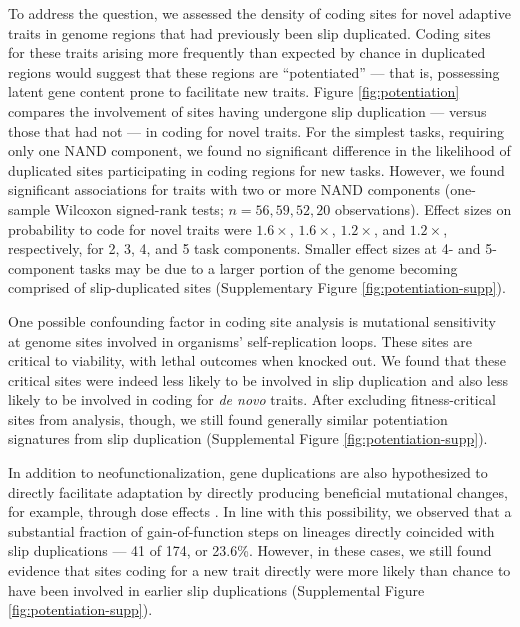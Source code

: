 To address the question, we assessed the density of coding sites for novel adaptive traits in genome regions that had previously been slip duplicated.
Coding sites for these traits arising more frequently than expected by chance in duplicated regions would suggest that these regions are ``potentiated'' --- that is, possessing latent gene content prone to facilitate new traits.
Figure \ref{fig:potentiation} compares the involvement of sites having undergone slip duplication --- versus those that had not --- in coding for novel traits.
For the simplest tasks, requiring only one NAND component, we found no significant difference in the likelihood of duplicated sites participating in coding regions for new tasks.
However, we found significant associations for traits with two or more NAND components (one-sample Wilcoxon signed-rank tests; $n=56,59,52,20$ observations).
Effect sizes on probability to code for novel traits were $1.6\times$, $1.6\times$, $1.2\times$, and $1.2\times$, respectively, for 2, 3, 4, and 5 task components.
Smaller effect sizes at 4- and 5-component tasks may be due to a larger portion of the genome becoming comprised of slip-duplicated sites (Supplementary Figure \ref{fig:potentiation-supp}).

One possible confounding factor in coding site analysis is mutational sensitivity at genome sites involved in organisms' self-replication loops.
These sites are critical to viability, with lethal outcomes when knocked out.
We found that these critical sites were indeed less likely to be involved in slip duplication and also less likely to be involved in coding for \textit{de novo} traits.
After excluding fitness-critical sites from analysis, though, we still found generally similar potentiation signatures from slip duplication (Supplemental Figure \ref{fig:potentiation-supp}).

In addition to neofunctionalization, gene duplications are also hypothesized to directly facilitate adaptation by directly producing beneficial mutational changes, for example, through dose effects \citep{kondrashov2012gene}.
In line with this possibility, we observed that a substantial fraction of gain-of-function steps on lineages directly coincided with slip duplications --- 41 of 174, or 23.6\%.
However, in these cases, we still found evidence that sites coding for a new trait directly were more likely than chance to have been involved in earlier slip duplications (Supplemental Figure \ref{fig:potentiation-supp}).


